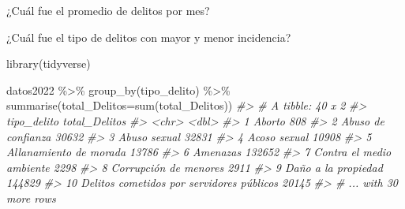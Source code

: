 \documentclass[
]{book}
\newenvironment{Shaded}{\begin{snugshade}}{\end{snugshade}}
\newcommand{\AttributeTok}[1]{\textcolor[rgb]{0.77,0.63,0.00}{#1}}
\newcommand{\CommentTok}[1]{\textcolor[rgb]{0.56,0.35,0.01}{\textit{#1}}}
\newcommand{\FunctionTok}[1]{\textcolor[rgb]{0.00,0.00,0.00}{#1}}
\newcommand{\NormalTok}[1]{#1}
\newcommand{\OtherTok}[1]{\textcolor[rgb]{0.56,0.35,0.01}{#1}}
\newcommand{\SpecialCharTok}[1]{\textcolor[rgb]{0.00,0.00,0.00}{#1}}
\newcommand{\StringTok}[1]{\textcolor[rgb]{0.31,0.60,0.02}{#1}}
\begin{document}
¿Cuál fue el promedio de delitos por mes?

\begin{Shaded}
\end{Shaded}

\begin{Shaded}
\end{Shaded}

¿Cuál fue el tipo de delitos con mayor y menor incidencia?

\begin{Shaded}
\begin{Highlighting}[]
\FunctionTok{library}\NormalTok{(tidyverse)}

\NormalTok{datos2022 }\SpecialCharTok{\%\textgreater{}\%} 
  \FunctionTok{group\_by}\NormalTok{(tipo\_delito) }\SpecialCharTok{\%\textgreater{}\%} 
  \FunctionTok{summarise}\NormalTok{(}\AttributeTok{total\_Delitos=}\FunctionTok{sum}\NormalTok{(total\_Delitos))}
\CommentTok{\#\textgreater{} \# A tibble: 40 x 2}
\CommentTok{\#\textgreater{}    tipo\_delito                               total\_Delitos}
\CommentTok{\#\textgreater{}    \textless{}chr\textgreater{}                                             \textless{}dbl\textgreater{}}
\CommentTok{\#\textgreater{}  1 Aborto                                              808}
\CommentTok{\#\textgreater{}  2 Abuso de confianza                                30632}
\CommentTok{\#\textgreater{}  3 Abuso sexual                                      32831}
\CommentTok{\#\textgreater{}  4 Acoso sexual                                      10908}
\CommentTok{\#\textgreater{}  5 Allanamiento de morada                            13786}
\CommentTok{\#\textgreater{}  6 Amenazas                                         132652}
\CommentTok{\#\textgreater{}  7 Contra el medio ambiente                           2298}
\CommentTok{\#\textgreater{}  8 Corrupción de menores                              2911}
\CommentTok{\#\textgreater{}  9 Daño a la propiedad                              144829}
\CommentTok{\#\textgreater{} 10 Delitos cometidos por servidores públicos         20145}
\CommentTok{\#\textgreater{} \# ... with 30 more rows}
\end{Highlighting}
\end{Shaded}


  
\end{document}
